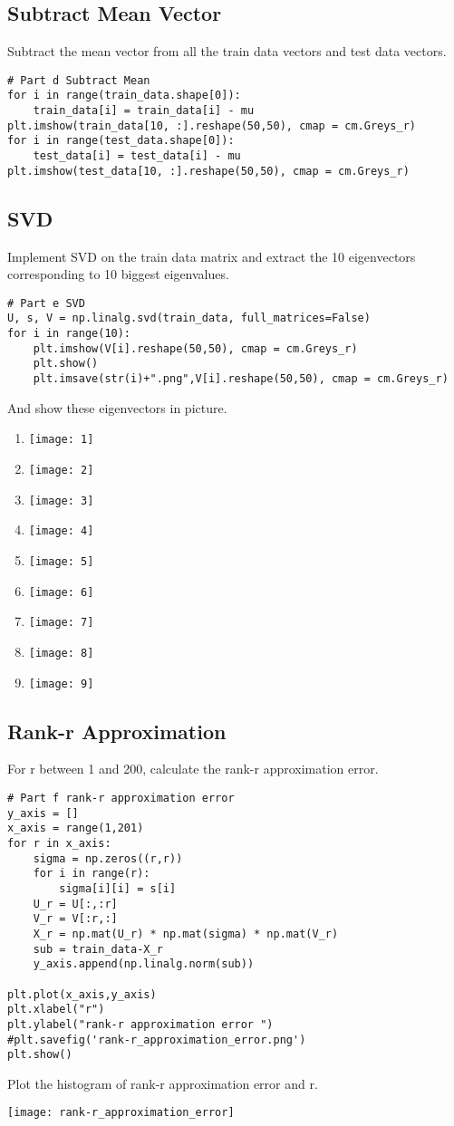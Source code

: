 \documentclass[a4paper]{article}
\begin{document}
\subsection*{Subtract Mean Vector}
Subtract the mean vector from all the train data vectors and test data vectors.
\begin{lstlisting}
# Part d Subtract Mean
for i in range(train_data.shape[0]):
    train_data[i] = train_data[i] - mu
plt.imshow(train_data[10, :].reshape(50,50), cmap = cm.Greys_r)
for i in range(test_data.shape[0]):
    test_data[i] = test_data[i] - mu
plt.imshow(test_data[10, :].reshape(50,50), cmap = cm.Greys_r)
\end{lstlisting}

\subsection*{SVD}
Implement SVD on the train data matrix and extract the 10 eigenvectors corresponding to 10 biggest eigenvalues. 
\begin{lstlisting}
# Part e SVD
U, s, V = np.linalg.svd(train_data, full_matrices=False)
for i in range(10):
    plt.imshow(V[i].reshape(50,50), cmap = cm.Greys_r)
    plt.show()
    plt.imsave(str(i)+".png",V[i].reshape(50,50), cmap = cm.Greys_r)
\end{lstlisting}
And show these eigenvectors in picture.
\begin{enumerate}
	\item \texttt{[image: 1]}
	\item \texttt{[image: 2]}
	\item \texttt{[image: 3]}
	\item \texttt{[image: 4]}
	\item \texttt{[image: 5]}
	\item \texttt{[image: 6]}
	\item \texttt{[image: 7]}
	\item \texttt{[image: 8]}
	\item \texttt{[image: 9]}
\end{enumerate}
\subsection*{Rank-r Approximation}
For r between 1 and 200, calculate the rank-r approximation error.
\begin{lstlisting}
# Part f rank-r approximation error
y_axis = []
x_axis = range(1,201)
for r in x_axis:
    sigma = np.zeros((r,r))
    for i in range(r):
        sigma[i][i] = s[i]
    U_r = U[:,:r]
    V_r = V[:r,:]
    X_r = np.mat(U_r) * np.mat(sigma) * np.mat(V_r)
    sub = train_data-X_r
    y_axis.append(np.linalg.norm(sub))

plt.plot(x_axis,y_axis)
plt.xlabel("r")
plt.ylabel("rank-r approximation error ")
#plt.savefig('rank-r_approximation_error.png')
plt.show()
\end{lstlisting}
Plot the histogram of rank-r approximation error and r.
\begin{center}
\texttt{[image: rank-r\_approximation\_error]}	
\end{center}
\end{document}
